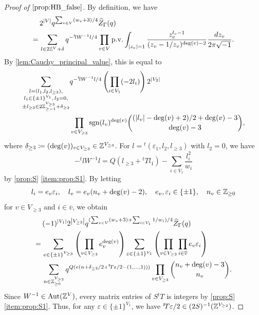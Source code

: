 \documentclass[11pt,a4paper,lualatex]{amsart}
\numberwithin{equation}{section} %
\begin{document}
\begin{proof}[Proof of $ \cref{prop:HB_false} $]
	By definition, we have
	\begin{align}
		&2^{\left\lvert V\right\rvert} q^{\sum_{v \in V} (w_{v} + 3)/4}
		\widehat{Z}_{\Gamma} (q) \\
		= \,
		&\sum_{l \in 2\mathbb{Z}^V + \delta} q^{-{}^t\!l W^{-1} l/4} 
		\prod_{v \in V}
		\mathrm{p.v.} \int_{\left\lvert z_v\right\rvert=1}
		\frac{ z_v^{l_v - 1} }{(z_v - 1/z_v)^{\deg(v) - 2}} \frac{dz_v}{2\pi\sqrt{-1}}.
	\end{align}
	By \cref{lem:Cauchy_principal_value}, this is equal to
	\begin{align}
		\sum_{\substack{
				l = (l_1, l_2, l_{\ge 3}), \\
				l_1 \in \{ \pm 1 \}^{V_1}, \,
				l_2 = 0, \\
				\pm l_{\ge 3} \in 2\mathbb{Z}_{\ge -1}^{V_{\ge 3}} + \delta_{\ge 3}
		}}
		&q^{-{}^t\!l W^{-1} l/4} 
		\left( \prod_{i \in V_1} (-2l_i) \right)  2^{\left\lvert V_2\right\rvert} \\
		&\prod_{v \in V_{\ge 3}} \operatorname{sgn}(l_v)^{\deg (v)} \binom{(\left\lvert l_v\right\rvert - \deg(v) + 2)/2 + \deg(v)-3}{\deg(v)-3},
	\end{align}
	where $ \delta_{\ge 3} \coloneqq (\deg(v))_{v \in V_{\ge 3}} \in \Z^{V_{\ge 3}} $.
	For $ l = {}^t\!(\varepsilon_1, l_2, l_{\ge 3}) $ with $ l_2 = 0 $, we have
	\[
	-{}^t\!l W^{-1} l
	= Q( l_{\ge 3} + {}^t\!T l_1) - \sum_{i \in V_1} \frac{l_i^2}{w_i}
	\]
	by \cref{prop:S} \cref{item:prop:S1}.
	By letting
	\[
	l_i = e_v \varepsilon_i, \quad
	l_v = e_v (n_v + \deg(v) - 2), \quad
	e_v, \varepsilon_i \in \{ \pm 1 \}, \quad
	n_v \in \mathbb{Z}_{\ge 0}
	\]
	for $ v \in V_{\ge 3} $ and $ i \in \overline{v} $, we obtain
	\begin{align}
		&(-1)^{\left\lvert V_1\right\rvert} 2^{\left\lvert V_{\ge 3}\right\rvert} q^{(\sum_{v \in V} (w_{v} + 3) + \sum_{i \in V_1} 1/w_i)/4}
		\widehat{Z}_{\Gamma} (q) \\
		= \,
		&\sum_{e \in \{ \pm 1 \}^{V_{\ge 3}}} \left( \prod_{v \in V_{\ge 3}} e_v^{\deg (v)} \right)
		\sum_{\varepsilon \in \{ \pm 1 \}^{V_1}}
		\left( \prod_{v \in V_{\ge 3}} \prod_{i \in \overline{v}} e_v \varepsilon_i \right) \\
		&\sum_{n \in \mathbb{Z}_{\ge 0}^{V_{\ge 3}}}
		q^{Q( e(n + \delta_{\ge 3}/2 + {}^t\!T \varepsilon/2 - (1, \dots, 1)) )}
		\prod_{v \in V_{\ge 3}} \binom{n_{v} + \deg(v) - 3}{n_{v}}.
	\end{align}
	Since $ W^{-1} \in \operatorname{Aut}(\mathbb{Z}^V) $, every matrix entries of $ S {}^t\!T $ is integers by \cref{prop:S} \cref{item:prop:S1}. 
	Thus, for any $ \varepsilon \in \{ \pm 1 \}^{V_1} $, we have $ {}^t\!T \varepsilon/2 \in (2S)^{-1}(\mathbb{Z}^{V_{\ge 2}}) $. 

\end{proof}
\end{document}
